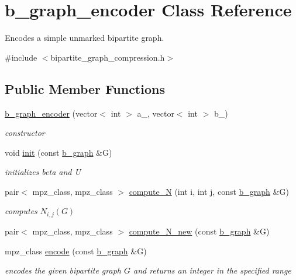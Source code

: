 \hypertarget{classb__graph__encoder}{}\section{b\+\_\+graph\+\_\+encoder Class Reference}
\label{classb__graph__encoder}


Encodes a simple unmarked bipartite graph.  




{\ttfamily \#include $<$bipartite\+\_\+graph\+\_\+compression.\+h$>$}

\subsection*{Public Member Functions}
\begin{DoxyCompactItemize}
\item 
\hyperlink{classb__graph__encoder_a77b8fc4f060a8ef159583f1cfa35f283}{b\+\_\+graph\+\_\+encoder} (vector$<$ int $>$ a\+\_\+, vector$<$ int $>$ b\+\_\+)
\begin{DoxyCompactList}\small\item\em constructor \end{DoxyCompactList}\item 
void \hyperlink{classb__graph__encoder_a9b62ac0580191ac42b98d764046af7cb}{init} (const \hyperlink{classb__graph}{b\+\_\+graph} \&G)
\begin{DoxyCompactList}\small\item\em initializes beta and U \end{DoxyCompactList}\item 
pair$<$ mpz\+\_\+class, mpz\+\_\+class $>$ \hyperlink{classb__graph__encoder_a3ffcfb945e8563d01e683fc5e5127d6d}{compute\+\_\+N} (int i, int j, const \hyperlink{classb__graph}{b\+\_\+graph} \&G)
\begin{DoxyCompactList}\small\item\em computes $N_{i,j}(G)$ \end{DoxyCompactList}\item 
pair$<$ mpz\+\_\+class, mpz\+\_\+class $>$ \hyperlink{classb__graph__encoder_abb9153c776f8c9ec9aeb6361080e84d4}{compute\+\_\+\+N\+\_\+new} (const \hyperlink{classb__graph}{b\+\_\+graph} \&G)
\item 
mpz\+\_\+class \hyperlink{classb__graph__encoder_a9dbf40f42a2eb12822b14ca10d580763}{encode} (const \hyperlink{classb__graph}{b\+\_\+graph} \&G)
\begin{DoxyCompactList}\small\item\em encodes the given bipartite graph $G$ and returns an integer in the specified range \end{DoxyCompactList}\end{DoxyCompactItemize}
